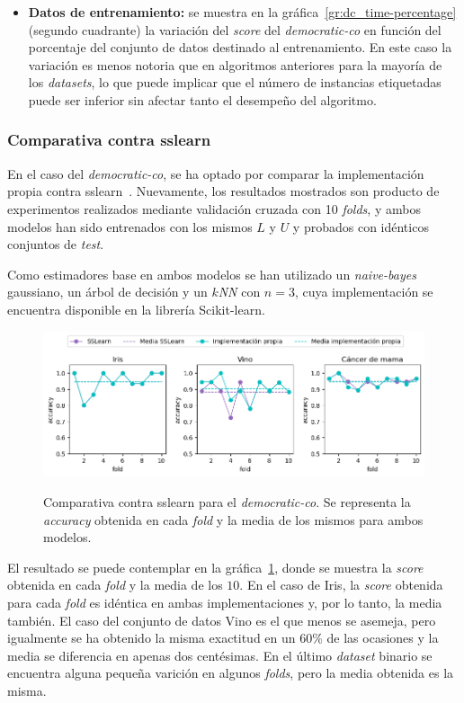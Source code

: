\begin{itemize}
	\item \textbf{Datos de entrenamiento:} se muestra en la gráfica~\ref{gr:dc_time-percentage} (segundo cuadrante) la variación del \textit{score} del \textit{democratic-co} en función del porcentaje del conjunto de datos destinado al entrenamiento. En este caso la variación es menos notoria que en algoritmos anteriores para la mayoría de los \textit{datasets}, lo que puede implicar que el número de instancias etiquetadas puede ser inferior sin afectar tanto el desempeño del algoritmo.
	
	
\end{itemize} 


\subsubsection{Comparativa contra sslearn}

En el caso del \textit{democratic-co}, se ha optado por comparar la implementación propia contra sslearn~\cite{sslearnRepo}. Nuevamente, los resultados mostrados son producto de experimentos realizados mediante validación cruzada con 10 \textit{folds}, y ambos modelos han sido entrenados con los mismos $L$ y $U$ y probados con idénticos conjuntos de \textit{test}.

Como estimadores base en ambos modelos se han utilizado un \textit{naive-bayes} gaussiano, un árbol de decisión y un \textit{$k$NN} con $n = 3$, cuya implementación se encuentra disponible en la librería Scikit-learn.

\begin{figure}[h]
	\caption[\textit{Democratic-co}: comparativa contra \textit{sslearn}]{Comparativa contra sslearn para el \textit{democratic-co}. Se representa la \textit{accuracy} obtenida en cada \textit{fold} y la media de los mismos para ambos modelos.}
	\centering
	\includegraphics[scale=0.62]{../img/memoria/5_democraticco_sslearn}
	\label{gr:dc_vs_sslearn}
\end{figure}

El resultado se puede contemplar en la gráfica~\ref{gr:dc_vs_sslearn}, donde se muestra la \textit{score} obtenida en cada \textit{fold} y la media de los $10$. En el caso de Iris, la \textit{score} obtenida para cada \textit{fold} es idéntica en ambas implementaciones y, por lo tanto, la media también. El caso del conjunto de datos Vino es el que menos se asemeja, pero igualmente se ha obtenido la misma exactitud en un 60\% de las ocasiones y la media se diferencia en apenas dos centésimas. En el último \textit{dataset} binario se encuentra alguna pequeña varición en algunos \textit{folds}, pero la media obtenida es la misma.

